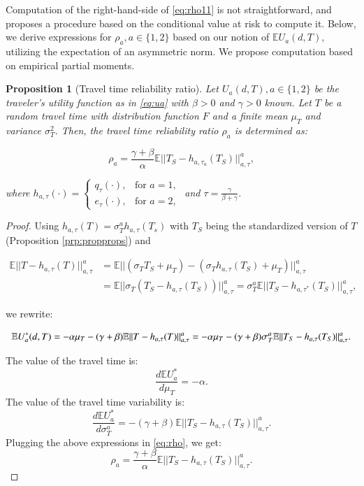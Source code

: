 \documentclass[preprint, 3p, authoryear]{elsarticle} %
\newtheorem{proposition}{Proposition}[section]
\theoremstyle{definition}
\theoremstyle{definition}
\theoremstyle{definition}
\theoremstyle{definition}
\theoremstyle{remark}
\begin{document}
Computation of the right-hand-side of \eqref{eq:rho11} is not straightforward, and \citet{li2019} proposes a procedure based on the conditional value at risk to compute it. Below, we derive expressions for \(\rho_a, a\in\{1,2\}\) based on our notion of \(\mathbb EU_a(d,T)\), utilizing the expectation of an asymmetric norm. We propose computation based on empirical partial moments.

\begin{proposition}[Travel time reliability ratio]
\protect\hypertarget{prp:proprho}{}\label{prp:proprho}Let \(U_a(d,T), a\in\{1,2\}\) be the traveler's utility function as in \eqref{eq:ua} with \(\beta>0\) and \(\gamma>0\) known. Let \(T\) be a random travel time with distribution function \(F\) and a finite mean \(\mu_T\) and variance \(\sigma_T^2\). Then, the travel time reliability ratio \(\rho_a\) is determined as:

\[\rho_a = \frac{\gamma+\beta}{\alpha}\mathbb E||T_S-h_{a,\tau_a}(T_S)||_{a,\tau}^a,\]

where \(h_{a,\tau}(\cdot) = \begin{cases} q_\tau(\cdot),&\text{for } a=1,\\ e_\tau(\cdot),&\text{for }a=2,\end{cases}\) and \(\tau = \frac{\gamma}{\beta+\gamma}\).
\end{proposition}

\begin{proof}
Using \(h_{a,\tau}(T) = \sigma_T^a h_{a,\tau}(T_s)\) with \(T_S\) being the standardized version of \(T\) (Proposition \ref{prp:propprops}) and

\begin{align*}\mathbb E||T-h_{a,\tau}(T)||_{a,\tau}^a&=\mathbb E||(\sigma_TT_S + \mu_T)-(\sigma_Th_{a,\tau}(T_S)+\mu_T)||_{a,\tau}^a \\
&= \mathbb E||\sigma_T(T_S-h_{a,\tau}(T_S))||_{a,\tau}^a = \sigma_T^a\mathbb E||T_S-h_{a,\tau^*}(T_S)||_{a,\tau}^a,\end{align*}

we rewrite:

\[\mathbb E U_a^*(d,T) =-\alpha \mu_T - (\gamma+\beta)\mathbb E||T-h_{a,\tau}(T)||_{a,\tau}^a\\
=-\alpha \mu_T - (\gamma+\beta)\sigma_T^a\mathbb E||T_S-h_{a,\tau}(T_S)||_{a,\tau}^a.\]

The value of the travel time is:
\[\frac{d\mathbb EU_a^*}{d\mu_T} = -\alpha.\]
The value of the travel time variability is:
\[\frac{d\mathbb EU_a^*}{d\sigma^a_T} = -(\gamma+\beta)\mathbb E||T_S-h_{a,\tau}(T_S)||_{a,\tau}^a.\]
Plugging the above expressions in \eqref{eq:rho}, we get:
\[\rho_a=\frac{\gamma+\beta}{\alpha}\mathbb E||T_S-h_{a,\tau}(T_S)||_{a,\tau}^a.\]
\end{proof}
\end{document}
